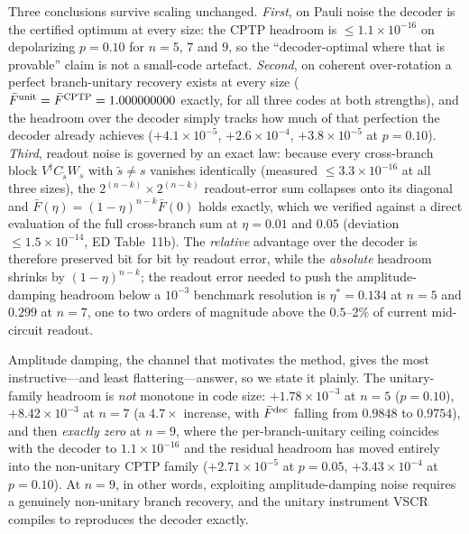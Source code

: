 \documentclass[aps,prxquantum,reprint,superscriptaddress]{revtex4-2}
\begin{document}
Three conclusions survive scaling unchanged. \emph{First}, on Pauli noise the
decoder is the certified optimum at every size: the CPTP headroom is
$\le1.1\times10^{-16}$ on depolarizing $p=0.10$ for $n=5$, $7$ and $9$, so the
``decoder-optimal where that is provable'' claim is not a small-code artefact.
\emph{Second}, on coherent over-rotation a perfect branch-unitary recovery exists
at every size ($\bar F^{\rm unit}=\bar F^{\rm CPTP}=1.000000000$ exactly, for all
three codes at both strengths), and the headroom over the decoder simply tracks
how much of that perfection the decoder already achieves
($+4.1\times10^{-5}$, $+2.6\times10^{-4}$, $+3.8\times10^{-5}$ at $p=0.10$).
\emph{Third}, readout noise is governed by an exact law: because every
cross-branch block $V^\dagger C_{\tilde s}W_s$ with $\tilde s\neq s$ vanishes
identically (measured $\le3.3\times10^{-16}$ at all three sizes), the
$2^{(n-k)}\!\times\!2^{(n-k)}$ readout-error sum collapses onto its diagonal and
$\bar F(\eta)=(1-\eta)^{n-k}\bar F(0)$ holds exactly, which we verified against a
direct evaluation of the full cross-branch sum at $\eta=0.01$ and $0.05$
(deviation $\le1.5\times10^{-14}$, ED Table~11b). The \emph{relative} advantage
over the decoder is therefore preserved bit for bit by readout error, while the
\emph{absolute} headroom shrinks by $(1-\eta)^{n-k}$; the readout error needed to
push the amplitude-damping headroom below a $10^{-3}$ benchmark resolution is
$\eta^\ast=0.134$ at $n=5$ and $0.299$ at $n=7$, one to two orders of magnitude
above the $0.5$--$2\%$ of current mid-circuit readout.

Amplitude damping, the channel that motivates the method, gives the most
instructive---and least flattering---answer, so we state it plainly. The
unitary-family headroom is \emph{not} monotone in code size: $+1.78\times10^{-3}$
at $n=5$ ($p=0.10$), $+8.42\times10^{-3}$ at $n=7$ (a $4.7\times$ increase, with
$\bar F^{\rm dec}$ falling from $0.9848$ to $0.9754$), and then \emph{exactly
zero} at $n=9$, where the per-branch-unitary ceiling coincides with the decoder
to $1.1\times10^{-16}$ and the residual headroom has moved entirely into the
non-unitary CPTP family ($+2.71\times10^{-5}$ at $p=0.05$, $+3.43\times10^{-4}$
at $p=0.10$). At $n=9$, in other words, exploiting amplitude-damping noise
requires a genuinely non-unitary branch recovery, and the unitary instrument VSCR
compiles to reproduces the decoder exactly.
\end{document}
